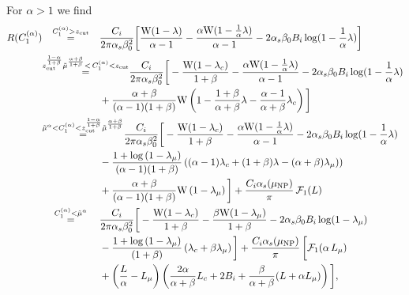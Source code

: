 \documentclass[letterpaper,11pt]{article}
\newcommand{\xlog}{{\rm W}}
\newcommand{\wideeq}[1]{\makebox[{#1}]{$=$}}
\newcommand{\as}{\alpha_s}
\newcommand{\C}[2]{C^{(#2)}_{#1}}
\newcommand{\zcut}{z_\text{cut}}
\newcommand{\ea}{{\C{1}{\alpha}}}
\begin{document}
For $\alpha>1$ we find
%
\begin{align}\label{full-rad-ang-beta-pos-alpha-gt-1}
R(\ea) 
%
& \overset{\ea>\zcut}{\wideeq{2.0cm}}  \frac{C_i}{2\pi \alpha_s \beta_0^2} \bigg[
    \frac{\xlog(1-\lambda)}{\alpha-1}
     -\frac{\alpha \xlog(1-\frac{1}{\alpha}\lambda)}{\alpha-1}  
     -2 \alpha_s \beta_0 B_i \log(1-\frac{1}{\alpha}\lambda)\bigg]\\
& \overset{\zcut^\frac{1-\alpha}{1+\beta}\tilde{\mu}^\frac{\alpha+\beta}{1+\beta}< \, \ea<\zcut}{\wideeq{2.0cm}}  \frac{C_i}{2\pi \alpha_s \beta_0^2} \bigg[
 -\frac{\xlog(1-\lambda_c)}{1+\beta}
     -\frac{\alpha \xlog(1-\frac{1}{\alpha}\lambda)}{\alpha-1}  
     -2 \alpha_s \beta_0 B_i \log(1-\frac{1}{\alpha}\lambda)\notag \\& \phantom{\wideeq{2.0cm}}+
     \frac{\alpha+\beta}{(\alpha-1)(1+\beta)} \xlog\left(1-\frac{1+\beta}{\alpha+\beta}\lambda-\frac{\alpha-1}{\alpha+\beta}\lambda_c\right)
     \bigg] \label{eq:first1}
\\
& \overset{\tilde{\mu}^\alpha<\ea<\zcut^\frac{1-\alpha}{1+\beta}\tilde{\mu}^\frac{\alpha+\beta}{1+\beta}}{\wideeq{2.0cm}} \frac{C_i}{2\pi \alpha_s \beta_0^2} \bigg[ 
-\frac{\xlog(1-\lambda_c)}{1+\beta}
     -\frac{\alpha \xlog(1-\frac{1}{\alpha}\lambda)}{\alpha-1}  
     -2 \alpha_s \beta_0 B_i \log(1-\frac{1}{\alpha}\lambda)\notag \\& \phantom{\wideeq{2.0cm}}-\frac{1+\log\left(1-\lambda_\mu \right)}{(\alpha-1)(1+\beta)} \left((\alpha-1) \lambda_c+(1+\beta) \lambda-(\alpha+\beta) \lambda_\mu) \right)\notag \\& \phantom{\wideeq{2.0cm}}+
     \frac{\alpha+\beta}{(\alpha-1)(1+\beta)} \xlog\left(1-\lambda_\mu \right)
 \bigg] +
  \frac{C_i \as(\mu_\text{NP})}{\pi} \, \mathcal{F}_1(L)
\\
& \overset{\ea<\tilde{\mu}^\alpha}{\wideeq{2.0cm}} \frac{C_i}{2\pi \alpha_s \beta_0^2} \bigg[ 
-\frac{\xlog(1-\lambda_c)}{1+\beta}
     -\frac{\beta \xlog(1-\lambda_\mu)}{1+\beta}  
     -2 \alpha_s \beta_0 B_i \log(1-\lambda_\mu)\notag \\& \phantom{\wideeq{2.0cm}}-\frac{1+\log\left(1-\lambda_\mu \right)}{(1+\beta)} \left( \lambda_c+\beta \lambda_\mu \right)
 \bigg]
 + \frac{C_i \as(\mu_\text{NP})}{\pi} \, \bigg[\mathcal{F}_1(\alpha \, L_\mu)
  \notag \\& \phantom{\wideeq{2.0cm}}
  + \left(\frac{L}{\alpha}- L_\mu\right)\left(\frac{2\alpha}{\alpha+\beta} L_c+2 B_i +\frac{\beta}{\alpha+\beta}(L+\alpha L_\mu) \right)
 \bigg],
 \end{align}
\end{document}
